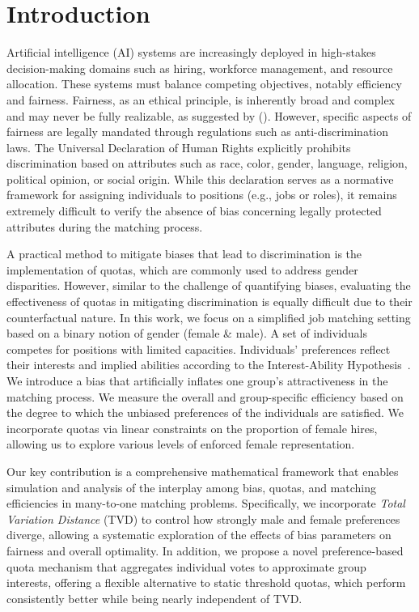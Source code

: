 \documentclass[letterpaper]{article}
\newcommand{\citet}[1]{\citeauthor{#1} (\citeyear{#1})}
\begin{document}
\section{Introduction}
Artificial intelligence (AI) systems are increasingly deployed in high-stakes decision-making domains such as hiring, workforce management, and resource allocation. These systems must balance competing objectives, notably efficiency and fairness. Fairness, as an ethical principle, is inherently broad and complex and may never be fully realizable, as suggested by \citet{Peterson_Hamrouni_2022}. However, specific aspects of fairness are legally mandated through regulations such as anti-discrimination laws. The Universal Declaration of Human Rights \cite{udhr1948} explicitly prohibits discrimination based on attributes such as race, color, gender, language, religion, political opinion, or social origin. While this declaration serves as a normative framework for assigning individuals to positions (e.g., jobs or roles), it remains extremely difficult to verify the absence of bias concerning legally protected attributes during the matching process.

A practical method to mitigate biases that lead to discrimination is the implementation of quotas, which are commonly used to address gender disparities. However, similar to the challenge of quantifying biases, evaluating the effectiveness of quotas in mitigating discrimination is equally difficult due to their counterfactual nature. In this work, we focus on a simplified job matching setting based on a binary notion of gender (female \& male). A set of individuals competes for positions with limited capacities. Individuals' preferences reflect their interests and implied abilities according to the Interest-Ability Hypothesis~\cite{jintelligence10030043}. We introduce a bias that artificially inflates one group's attractiveness in the matching process. We measure the overall and group-specific efficiency based on the degree to which the unbiased preferences of the individuals are satisfied. We incorporate quotas via linear constraints on the proportion of female hires, allowing us to explore various levels of enforced female representation. 

Our key contribution is a comprehensive mathematical framework that enables simulation and analysis of the interplay among bias, quotas, and matching efficiencies in many-to-one matching problems. Specifically, we incorporate \textit{Total Variation Distance} (TVD) to control how strongly male and female preferences diverge, allowing a systematic exploration of the effects of bias parameters on fairness and overall optimality. In addition, we propose a novel preference-based quota mechanism that aggregates individual votes to approximate group interests, offering a flexible alternative to static threshold quotas, which perform consistently better while being nearly independent of TVD.
\end{document}
